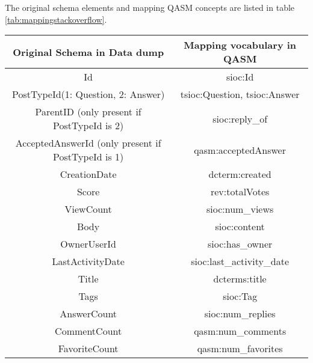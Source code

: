 

The original schema elements and mapping QASM concepts are listed in table \ref{tab:mappingstackoverflow}.

\begin{sidewaystable}
    \centering
    \begin{tabular}{|c|c|}
    \hline
    Original Schema in Data dump & Mapping vocabulary in QASM \\ \hline
        Id       &  sioc:Id \\ \hline
        PostTypeId(1: Question, 2: Answer) & tsioc:Question, tsioc:Answer   \\ \hline
        ParentID (only present if PostTypeId is 2) & sioc:reply\_of   \\ \hline
        AcceptedAnswerId (only present if PostTypeId is 1) & qasm:acceptedAnswer  \\ \hline 
        CreationDate & dcterm:created \\ \hline
        Score & rev:totalVotes \\ \hline
        ViewCount & sioc:num\_views \\ \hline
        Body & sioc:content \\ \hline %
        OwnerUserId & sioc:has\_owner \\ \hline
        LastActivityDate & sioc:last\_activity\_date\\ \hline
        Title & dcterms:title\\ \hline
        Tags & sioc:Tag\\ \hline
        AnswerCount & sioc:num\_replies\\ \hline
        CommentCount & qasm:num\_comments\\ \hline
        FavoriteCount & qasm:num\_favorites\\ \hline
    \end{tabular}
    \caption{Mapping between original data dump of Stackoverflow and QASM vocabulary}
    \label{tab:mappingstackoverflow}
\end{sidewaystable}

